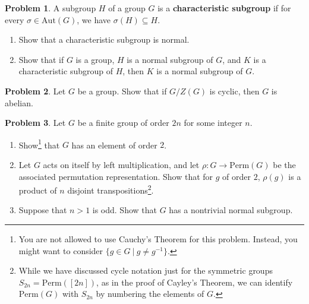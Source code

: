 \documentclass[11pt]{article}
\theoremstyle{definition}
\newtheorem{problem}{Problem}
\begin{document}
      
\smallskip


\begin{problem} A subgroup $H$ of a group $G$ is a \textbf{characteristic subgroup} if for every $\sigma\in \mathrm{Aut}(G)$, we have $\sigma(H) \subseteq H$.
\begin{enumerate}[(3.1)]
\item Show that a characteristic subgroup is normal.
\item Show that if $G$ is a group, $H$ is a normal subgroup of $G$, and $K$ is a characteristic subgroup of $H$, then $K$ is a normal subgroup of $G$.
\end{enumerate}
\end{problem}


\smallskip

\begin{problem} Let $G$ be a group. Show that if $G/Z(G)$ is cyclic, then $G$ is abelian.
\end{problem} 



\smallskip

\begin{problem} Let $G$ be a finite group of order $2n$ for some integer $n$.
\begin{enumerate}[(5.1)]
\item Show\footnote{You are not allowed to use Cauchy's Theorem for this problem. Instead, you might want to consider ${\{g\in G \ | \ g \neq g^{-1}\}}$.} that $G$ has an element of order $2$.
\item Let $G$ acts on itself by left multiplication, and let $\rho:G \to \mathrm{Perm}(G)$ be the associated permutation representation. Show that for $g$ of order $2$, $\rho(g)$ is a product of $n$ disjoint transpositions\footnote{While we have discussed cycle notation just for the symmetric groups $S_{2n} = \mathrm{Perm}([2n])$, as in the proof of Cayley's Theorem, we can identify $\mathrm{Perm}(G)$ with $S_{2n}$ by numbering the elements of $G$.}.
\item Suppose that $n>1$ is odd. Show that $G$ has a nontrivial normal subgroup.
\end{enumerate}

\end{problem}
\end{document}

